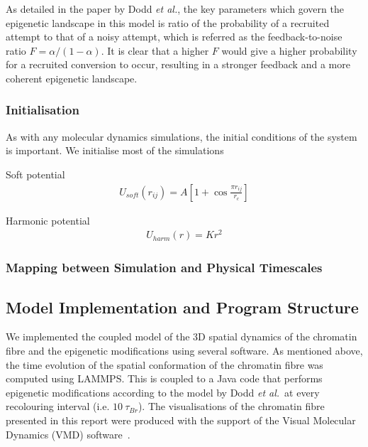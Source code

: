 \documentclass[12pt]{article}
\newcommand{\etal}{\emph{et al.}}
\begin{document}
As detailed in the paper by Dodd \etal, the key parameters which govern the epigenetic landscape in this model is ratio of the probability of a recruited attempt to that of a noisy attempt, which is referred as the feedback-to-noise ratio $F = \alpha / (1-\alpha)$. It is clear that a higher $F$ would give a higher probability for a recruited conversion to occur, resulting in a stronger feedback and a more coherent epigenetic landscape.


\subsubsection{Initialisation}
As with any molecular dynamics simulations, the initial conditions of the system is important. We initialise most of the simulations

Soft potential
\begin{eqnarray}
U_{soft}(r_{ij}) = A\left[1+\cos\frac{\pi r_{ij}}{r_c}\right]
\end{eqnarray}

Harmonic potential
\begin{eqnarray}
U_{harm}(r) = Kr^2
\end{eqnarray}

\subsubsection{Mapping between Simulation and Physical Timescales}

\subsection{Model Implementation and Program Structure}
We implemented the coupled model of the 3D spatial dynamics of the chromatin fibre and the epigenetic modifications using several software. As mentioned above, the time evolution of the spatial conformation of the chromatin fibre was computed using LAMMPS. This is coupled to a Java code that performs epigenetic modifications according to the model by Dodd \etal~at every recolouring interval (i.e. $10~\tau_{Br}$). The visualisations of the chromatin fibre presented in this report were produced with the support of the Visual Molecular Dynamics (VMD) software~\cite{humphrey1996}.
\end{document}
